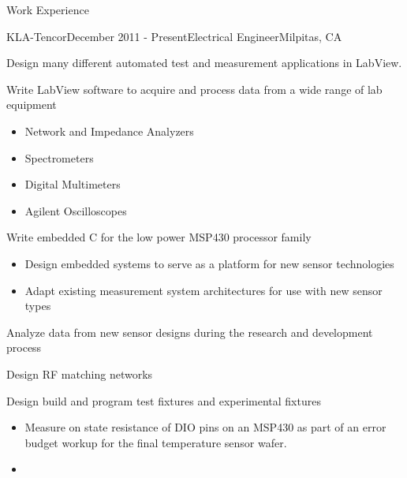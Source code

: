 \documentclass{resume} %
\begin{document}
\begin{rSection}{Work Experience}

\begin{rSubsection}{KLA-Tencor}{December 2011 - Present}{Electrical Engineer}{Milpitas, CA}
\smallskip
\item Design many different automated test and measurement applications in LabView.

\item Write LabView software to acquire and process data from a wide range of lab equipment
\begin{itemize}
\itemsep -0.5em \vspace{-0.5em}
\renewcommand{\labelitemi}{-}
\item Network and Impedance Analyzers
\item Spectrometers
\item Digital Multimeters
\item Agilent Oscilloscopes 
\end{itemize}

\item Write embedded C for the low power MSP430 processor family
\begin{itemize}
\itemsep -0.5em \vspace{-0.5em}
\renewcommand{\labelitemi}{-}
\item Design embedded systems to serve as a platform for new sensor technologies
\item Adapt existing measurement system architectures for use with new sensor types
\end{itemize}
\item Analyze data from new sensor designs during the research and development process
\item Design RF matching networks
\item Design build and program test fixtures and experimental fixtures
\begin{itemize}
\itemsep -0.5em \vspace{-0.5em}
\renewcommand{\labelitemi}{-}
\item Measure on state resistance of DIO pins on an MSP430 as part of an error budget workup for the final temperature sensor wafer.
\item 
\end{itemize}
\end{rSubsection}



\end{rSection}
\end{document}
